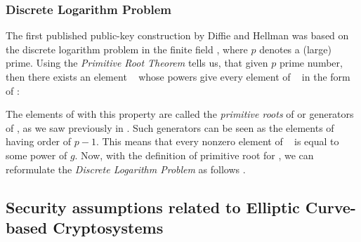 \subsubsection{Discrete Logarithm Problem}
\label{ssec:ch1.dlogproblem}



The first published public-key construction by Diffie and Hellman was based on the discrete logarithm problem in the finite field , where $p$ denotes a (large) prime.  Using the \textit{Primitive Root Theorem}\cite{hoffsteinintrotomathematicalcryptograhpy} tells us, that given $p$  prime number, then there exists an element \FieldFpStar~ whose powers give every element of \FieldFpStar~ in the form of :


The elements of  with this property are called the \textit{primitive roots} of  or generators of \FieldFpStar, as we saw previously in . Such generators can be seen as the elements of \FieldFpStar~ having order of $p-1$.  This means that every nonzero element of \FieldFp~ is equal to some power of $g$.  Now, with the definition of  primitive root for \FieldFp, we can reformulate the \textit{Discrete Logarithm Problem} as follows \cite{hoffsteinintrotomathematicalcryptograhpy}.


\subsection{Security assumptions related to Elliptic Curve-based Cryptosystems }
\label{sec:ch1.diffihellmannassumptionsellipticurvesecurity}

